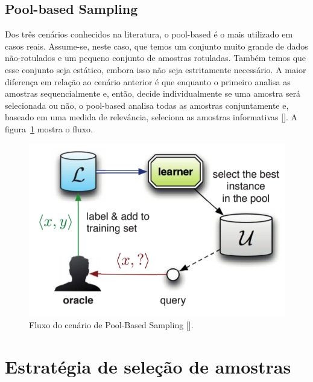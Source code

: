 \subsection{Pool-based Sampling}
\label{sec:cenarios_pool}

Dos três cenários conhecidos na literatura, o pool-based é o mais utilizado em casos reais.
Assume-se, neste caso, que temos um conjunto muito grande de dados não-rotulados e um pequeno conjunto de amostras rotuladas. Também temos que esse conjunto seja estático, embora isso não seja estritamente necessário. A maior diferença em relação ao cenário anterior é que enquanto o primeiro analisa as amostras sequencialmente e, então, decide individualmente se uma amostra será selecionada ou não, o pool-based analisa todas as amostras conjuntamente e, baseado em uma medida de relevância, seleciona as amostras informativas [\cite{settles2014active}]. A figura~\ref{fig:settles_2014_pool} mostra o fluxo.

\begin{figure}
  \centering
  \includegraphics[width=.5\textwidth]{figures/settles_2014_pool.png}
  \caption{Fluxo do cenário de Pool-Based Sampling [\cite{settles2014active}].}
  \label{fig:settles_2014_pool}
\end{figure}




\section{Estratégia de seleção de amostras}
\label{sec:query_strategy}

